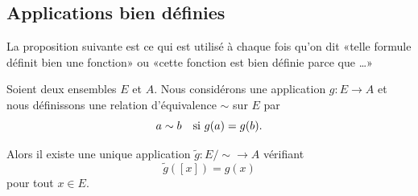 \subsection{Applications bien définies}
\label{SUBooApplicBienDef}

La proposition suivante est ce qui est utilisé à chaque fois qu'on dit «telle formule définit bien une fonction» ou «cette fonction est bien définie parce que \ldots»

\begin{proposition}	\label{PROPooCONJooTpJwBe}
	Soient deux ensembles \( E\) et \( A\). Nous considérons une application \(g \colon E\to A  \) et nous définissons une relation d'équivalence \( \sim\) sur \( E\) par 
	\begin{equation}	\label{EQNooDefEquivMemeImage}
		 a\sim b \text{\quad si } g(a)=g(b).
	\end{equation}

	Alors il existe une unique application \(\tilde g  \colon E/\sim\to A  \) vérifiant
	\begin{equation}	\label{EQooCTHKooTXPfyh}
		\tilde g([x])=g(x)
	\end{equation}
	pour tout \( x\in E\).
\end{proposition}

